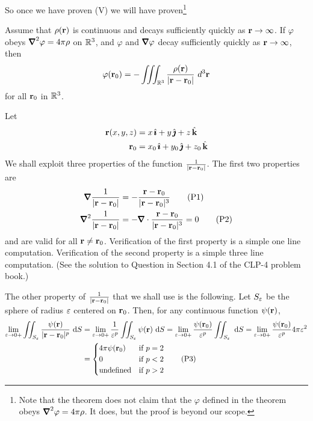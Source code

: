 So once we have proven (V) we will have proven\footnote{Note that the theorem
does not claim that the $\varphi$ defined in the theorem obeys
$\vnabla^2\varphi = 4\pi\rho$. It does, but the proof is beyond our scope.}
\begin{theorem}\label{thm:PoissonSoln}
Assume that $\rho(\mathbf{r})$ is continuous and decays sufficiently quickly as
$\mathbf{r}\rightarrow\infty$.  If $\varphi$ obeys
$\vnabla^2\varphi = 4\pi\rho$ on $\mathbb{R}^3$, and $\varphi$ 
and $\vnabla\varphi$ decay sufficiently quickly as $\mathbf{r}\rightarrow\infty$, then
\begin{equation*}
\varphi(\mathbf{r}_0)=
-\iiint_{\mathbb{R}^3}\frac{ \rho(\mathbf{r})}{|\mathbf{r}-\mathbf{r}_0|}\ d^3\mathbf{r}
\end{equation*}
for all $\mathbf{r}_0$ in $\mathbb{R}^3$.
\end{theorem}

Let 
\begin{align*}
\mathbf{r}(x,y,z)&=x\,\hat{\pmb{\imath}}+y\,\hat{\pmb{\jmath}}+z\,\hat{\mathbf{k}}\\
\mathbf{r}_0&=x_0\,\hat{\pmb{\imath}}+y_0\,\hat{\pmb{\jmath}}+z_0\,\hat{\mathbf{k}}
\end{align*}
We shall exploit three properties of the function
$\frac{1}{|\mathbf{r}-\mathbf{r}_0|}$. The first two properties are
\begin{align}
\vnabla \frac{1}{|\vr-\vr_0|} &=-\frac{\vr-\vr_0}{|\vr-\vr_0|^3}\tag{P1}\\
\vnabla^2 \frac{1}{|\vr-\vr_0|} &=-\vnabla\cdot\frac{\vr-\vr_0}{|\vr-\vr_0|^3}
=0
\tag{P2}\end{align}
and are valid for all $\mathbf{r}\ne \mathbf{r}_0$. Verification of the first property is
a simple one line computation. Verification of the second property is
a simple three line computation. (See the solution to Question 
 in Section 4.1 of the CLP-4 problem book.)

The other property of $\frac{1}{|\mathbf{r}-\mathbf{r}_0|}$ 
that we shall use is the following. Let $S_\varepsilon$ be the sphere of 
radius $\varepsilon$ centered on $\mathbf{r}_0$. Then, for any continuous function $\psi(\mathbf{r})$,
\begin{align}
\lim_{\varepsilon\rightarrow 0+}\iint_{S_\varepsilon}
              \frac{\psi(\mathbf{r})}{|\mathbf{r}-\mathbf{r}_0|^p}\ \mathrm{d}S
&=\lim_{\varepsilon\rightarrow 0+} \frac{1}{\varepsilon^p} \iint_{S_\varepsilon}
              \psi(\mathbf{r})\ \mathrm{d}S
=\lim_{\varepsilon\rightarrow 0+}\frac{\psi(\mathbf{r}_0)}{\varepsilon^p}
             \iint_{S_\varepsilon}\ \mathrm{d}S
=\lim_{\varepsilon\rightarrow 0+}\frac{\psi(\mathbf{r}_0)}{\varepsilon^p}4\pi\varepsilon^2
\notag\\
&=\begin{cases}4\pi\psi(\mathbf{r}_0)& \text{if $p=2$}\\
         0             & \text{if $p<2$}\\
         \text{undefined} & \text{if $p>2$}
         \end{cases}
\tag{P3}
\end{align}

